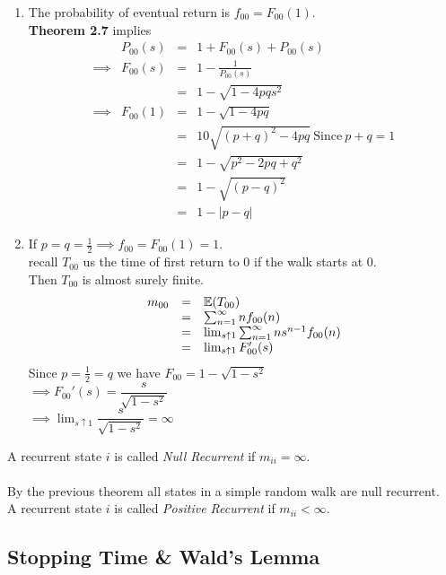 \documentclass[11pt,a4paper]{article}
\begin{document}
\proof{}
\begin{enumerate}[label=\roman*)]
	\item The probability of eventual return is $f_{00}=F_{00}(1)$.\\
	\textbf{Theorem 2.7} implies
	\[\begin{array}{rrcl}
	&P_{00}(s)&=&1+F_{00}(s)+P_{00}(s)\\
	\implies&F_{00}(s)&=&1-\frac{1}{P_{00}(s)}\\
	&&=&1-\sqrt{1-4pqs^2}\\
	\implies&F_{00}(1)&=&1-\sqrt{1-4pq}\\
	&&=&10\sqrt{(p+q)^2-4pq}\ \mathrm{Since\ }p+q=1\\
	&&=&1-\sqrt{p^2-2pq+q^2}\\
	&&=&1-\sqrt{(p-q)^2}\\
	&&=&1-|p-q|
	\end{array}\]
	\item If $p=q=\frac{1}{2}\implies f_{00}=F_{00}(1)=1$.\\
	recall $T_{00}$ us the time of first return to 0 if the walk starts at 0.\\
	Then $T_{00}$ is almost surely finite.
	\[\begin{array}{rcl}
	m_{00}&=&\mathbb{E}(T_{00})\\
	&=&\sum_{n=1}^\infty nf_{00}(n)\\
	&=&\lim_{s\uparrow1}\sum_{n=1}^\infty ns^{n-1}f_{00}(n)\\
	&=&\lim_{s\uparrow1}F_{00}'(s)
	\end{array}\]
	Since $p=\frac{1}{2}=q$ we have $F_{00}=1-\sqrt{1-s^2}$\\
	$\implies F_{00}'(s)=\dfrac{s}{\sqrt{1-s^2}}$\\
	$\implies\lim_{s\uparrow1}\dfrac{s}{\sqrt{1-s^2}}=\infty$
\end{enumerate}

A recurrent state $i$ is called \textit{Null Recurrent} if $m_{ii}=\infty$.\\
\\ By the previous theorem all states in a simple random walk are null recurrent.\\

A recurrent state $i$ is called \textit{Positive Recurrent} if $m_{ii}<\infty$.\\

\subsection{Stopping Time \& Wald's Lemma}
\end{document}
